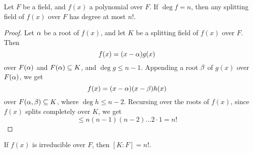 \begin{proposition}\label{proposition_8.4.3}
  Let $F$ be a field, and $f(x)$ a polynomial over $F$. If
  $\deg{f}=n$, then any splitting field of $f(x)$ over $F$ has degree
  at most $n!$.
\end{proposition}
\begin{proof}
  Let $\alpha$ be a root of $f(x)$, and let $K$ be a splitting field of
  $f(x)$ over $F$. Then
  \begin{equation*}
    f(x)=(x-\alpha)g(x)
  \end{equation*}
  over $F(\alpha)$ and $F(\alpha)
  \subseteq K$, and $\deg{g} \leq n-1$. Appending a root $\beta$ of
  $g(x)$ over $F(\alpha)$, we get
  \begin{equation*}
    f(x)=(x-\alpha)(x-\beta)h(x)
  \end{equation*}
  over $F(\alpha,\beta) \subseteq K$, where $\deg{h} \leq n-2$. Recursing
  over the roots of $f(x)$, since $f(x)$ splits completely over $K$,
  we get
  \begin{equation*}
    [K:F] \leq n(n-1)(n-2)\dots 2 \cdot 1=n!
  \end{equation*}
\end{proof}
\begin{corollary}
  If $f(x)$ is irreducible over $F$, then  $[K:F]=n!$.
\end{corollary}


